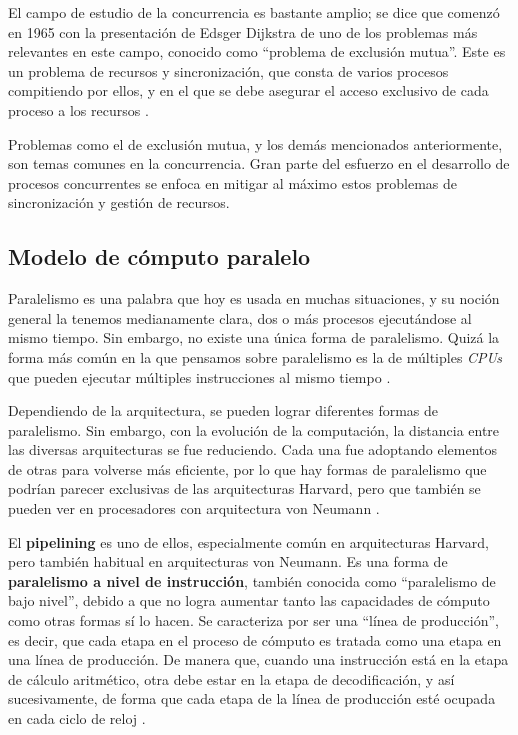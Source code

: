 \documentclass[letterpaper,12pt,oneside]{book}
\begin{document}
		El campo de estudio de la concurrencia es bastante amplio; se dice que comenzó en 1965 con la presentación de Edsger Dijkstra de uno
		de los problemas más relevantes en este campo, conocido como ``problema de exclusión mutua''. Este es un 
		problema de recursos y sincronización, que consta de varios procesos compitiendo por ellos, y en el que se debe asegurar el acceso exclusivo de
		cada proceso a los recursos \cite{gadi_taubenfeld_concurrent_nodate}. 
  
        Problemas como el de exclusión mutua, y los demás mencionados anteriormente,
		son temas comunes en la concurrencia. Gran parte del esfuerzo en el desarrollo de procesos concurrentes se enfoca en mitigar al máximo estos problemas de sincronización y gestión de recursos.
		
		
		
		\subsection{Modelo de cómputo paralelo}

		Paralelismo es una palabra que hoy es usada en muchas situaciones, y su noción general la tenemos medianamente clara, dos o más procesos
		ejecutándose al mismo tiempo. Sin embargo, no existe una única forma de paralelismo. Quizá la forma más común en la que pensamos sobre paralelismo
		es la de múltiples \textit{CPUs} que pueden ejecutar múltiples instrucciones al mismo tiempo \cite{null_essentials_2003}.
  
        Dependiendo de la arquitectura, se pueden lograr diferentes formas de paralelismo. Sin embargo,
		con la evolución de la computación, la distancia entre las diversas arquitecturas se fue reduciendo. Cada una fue adoptando
		elementos de otras para volverse más eficiente, por lo que hay formas de paralelismo que podrían parecer exclusivas de las arquitecturas
		Harvard, pero que también se pueden ver en procesadores con arquitectura von Neumann \cite{null_essentials_2003}.
  
        El \textbf{pipelining} es uno de ellos, especialmente común en arquitecturas Harvard, pero también habitual en arquitecturas von Neumann. Es una forma de \textbf{paralelismo
		a nivel de instrucción}, también conocida como ``paralelismo de bajo nivel'', debido a que no logra aumentar tanto las capacidades
		de cómputo como otras formas sí lo hacen. Se caracteriza por ser una ``línea de producción'', es decir, que cada etapa en el proceso de cómputo es 
		tratada
		como una etapa en una línea de producción. De manera que, cuando una instrucción está en la etapa de cálculo aritmético,  otra debe estar en la etapa de decodificación, y así sucesivamente, de forma que cada etapa de la línea de producción
		esté ocupada en cada ciclo de reloj \cite[p.421]{null_essentials_2003}. 
  
\end{document}
